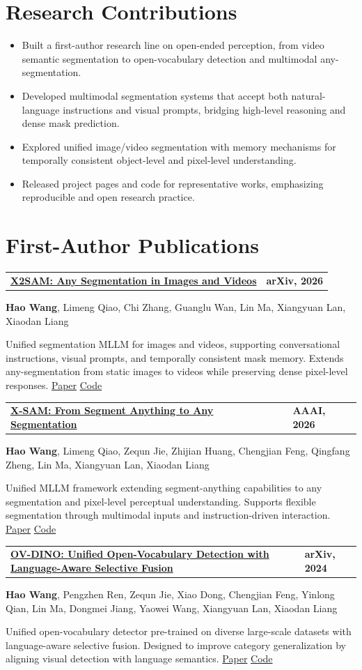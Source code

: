 \documentclass[10pt,letterpaper]{article}
\makeatletter
\newcommand{\datebadge}[1]{%
  \begingroup
  \textcolor{muted}{\footnotesize\bfseries #1}%
  \endgroup
}
\newcommand{\publication}[5]{%
  \Needspace{5\baselineskip}
  \vspace{2pt}
  \begin{tabularx}{\textwidth}{@{}>{\RaggedRight\arraybackslash}X>{\RaggedLeft\arraybackslash}p{0.18\textwidth}@{}}
    \textbf{\href{#1}{\color{ink}#2}} & \datebadge{#3}
  \end{tabularx}
  {\small #4}\par
  \vspace{1pt}
  {\small\color{muted}#5}\par
  \vspace{7pt}
}
\makeatother
\begin{document}
\section{Research Contributions}
  \begin{itemize}
    \item Built a first-author research line on open-ended perception, from video semantic segmentation to open-vocabulary detection and multimodal any-segmentation.
    \item Developed multimodal segmentation systems that accept both natural-language instructions and visual prompts, bridging high-level reasoning and dense mask prediction.
    \item Explored unified image/video segmentation with memory mechanisms for temporally consistent object-level and pixel-level understanding.
    \item Released project pages and code for representative works, emphasizing reproducible and open research practice.
  \end{itemize}

\section{First-Author Publications}
\publication
  {https://wanghao9610.github.io/X2SAM/}
  {X2SAM: Any Segmentation in Images and Videos}
  {arXiv, 2026}
  {\textbf{Hao Wang}, Limeng Qiao, Chi Zhang, Guanglu Wan, Lin Ma, Xiangyuan Lan, Xiaodan Liang}
  {Unified segmentation MLLM for images and videos, supporting conversational instructions, visual prompts, and temporally consistent mask memory. Extends any-segmentation from static images to videos while preserving dense pixel-level responses. \href{https://arxiv.org/abs/2605.00891}{Paper} \textbar{} \href{https://github.com/wanghao9610/X2SAM}{Code}}

\publication
  {https://wanghao9610.github.io/X-SAM/}
  {X-SAM: From Segment Anything to Any Segmentation}
  {AAAI, 2026}
  {\textbf{Hao Wang}, Limeng Qiao, Zequn Jie, Zhijian Huang, Chengjian Feng, Qingfang Zheng, Lin Ma, Xiangyuan Lan, Xiaodan Liang}
  {Unified MLLM framework extending segment-anything capabilities to any segmentation and pixel-level perceptual understanding. Supports flexible segmentation through multimodal inputs and instruction-driven interaction. \href{https://arxiv.org/abs/2508.04655}{Paper} \textbar{} \href{https://github.com/wanghao9610/X-SAM}{Code}}

\publication
  {https://wanghao9610.github.io/OV-DINO/}
  {OV-DINO: Unified Open-Vocabulary Detection with Language-Aware Selective Fusion}
  {arXiv, 2024}
  {\textbf{Hao Wang}, Pengzhen Ren, Zequn Jie, Xiao Dong, Chengjian Feng, Yinlong Qian, Lin Ma, Dongmei Jiang, Yaowei Wang, Xiangyuan Lan, Xiaodan Liang}
  {Unified open-vocabulary detector pre-trained on diverse large-scale datasets with language-aware selective fusion. Designed to improve category generalization by aligning visual detection with language semantics. \href{https://arxiv.org/abs/2407.07844}{Paper} \textbar{} \href{https://github.com/wanghao9610/OV-DINO}{Code}}
\end{document}
